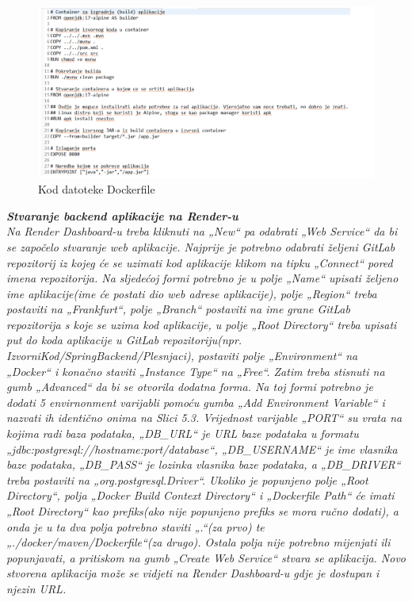 	     \begin{figure}[H]
	     	\centering
	     	\includegraphics[width=\textwidth]{slike/deployment/slika3.png}
	     	\caption{Kod datoteke Dockerfile}
	     	\label{fig:my_label}
	     \end{figure}
     
        \textbf{\textit{Stvaranje backend aplikacije na Render-u}}\\

       	\textit{Na Render Dashboard-u treba kliknuti na „New“ pa odabrati „Web Service“ da bi se započelo stvaranje web aplikacije. Najprije je potrebno odabrati željeni GitLab repozitorij iz kojeg će se uzimati kod aplikacije klikom na tipku „Connect“ pored imena repozitorija. Na sljedećoj formi potrebno je u polje „Name“ upisati željeno ime aplikacije(ime će postati dio web adrese aplikacije), polje „Region“ treba postaviti na „Frankfurt“, polje „Branch“ postaviti na ime grane GitLab repozitorija s koje se uzima kod aplikacije, u polje „Root Directory“ treba upisati put do koda aplikacije u GitLab repozitoriju(npr. IzvorniKod/SpringBackend/Plesnjaci), postaviti polje „Environment“ na „Docker“ i konačno staviti „Instance Type“ na „Free“. Zatim treba stisnuti na gumb „Advanced“ da bi se otvorila dodatna forma. Na toj formi potrebno je dodati 5 envirnonment varijabli pomoću gumba „Add Environment Variable“ i nazvati ih identično onima na Slici 5.3. Vrijednost varijable „PORT“ su vrata na kojima radi baza podataka, „DB\_URL“ je URL baze podataka u formatu „jdbc:postgresql://hostname:port/database“, „DB\_USERNAME“ je ime vlasnika baze podataka, „DB\_PASS“ je lozinka vlasnika baze podataka, a „DB\_DRIVER“ treba postaviti na „org.postgresql.Driver“. Ukoliko je popunjeno polje „Root Directory“, polja „Docker Build Context Directory“ i „Dockerfile Path“ će imati „Root Directory“ kao prefiks(ako nije popunjeno prefiks se mora ručno dodati), a onda je u ta dva polja potrebno staviti „.“(za prvo) te „./docker/maven/Dockerfile“(za drugo). Ostala polja nije potrebno mijenjati ili popunjavati, a pritiskom na gumb „Create Web Service“ stvara se aplikacija. Novo stvorena aplikacija može se vidjeti na Render Dashboard-u gdje je dostupan i njezin URL.}
       	
